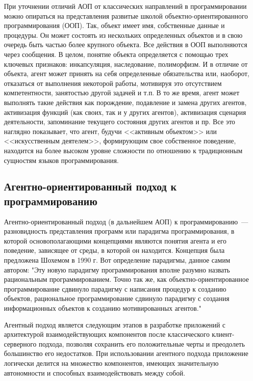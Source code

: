При уточнении отличий АОП от классических направлений в программировании можно опираться на представления развитые школой объектно-ориентированного программирования (ООП). Так, объект имеет имя, собственные данные и процедуры. Он может состоять из нескольких определенных объектов и в свою очередь быть частью более крупного объекта. Все действия в ООП выполняются через сообщения. В целом, понятие объекта определяется с помощью трех ключевых признаков: инкапсуляция, наследование, полиморфизм. И в отличие от объекта, агент может принять на себя определенные обязательства или, наоборот, отказаться от выполнения некоторой работы, мотивируя это отсутствием компетентности, занятостью другой задачей и т.п. В то же время, агент может выполнять такие действия как порождение, подавление и замена других агентов, активизация функций (как своих, так и у других агентов), активизация сценария деятельности, запоминание текущего состояния других агентов и пр. Все это наглядно показывает, что агент, будучи <<активным объектом>> или <<искусственным деятелем>>, формирующим свое собственное поведение, находится на более высоком уровне сложности по отношению к традиционным сущностям языков программирования.

\subsection{Агентно-ориентированный подход к программированию}
Агентно-ориентированный подход (в дальнейшем АОП) к программированию~---  разновидность представления программ или парадигма программирования, в которой основополагающими концепциями являются понятия агента и его поведение, зависящее от среды, в которой он находится. Концепция была предложена Шохемом в 1990 г. Вот определение парадигмы, данное самим автором:
"Эту новую парадигму программирования вполне разумно назвать рациональным программированием. Точно так же, как объектно-ориентированное программирование сдвинуло парадигму с написания процедур к созданию объектов, рациональное программирование сдвинуло парадигму с создания информационных объектов к созданию мотивированных агентов."

Агентный подход является следующим этапов в разработке приложений с архитектурой взаимодействующих компонентов после классического клиент-серверного подхода, позволяя сохранить его положительные черты и преодолеть большинство его недостатков. При использовании агентного подхода приложение логически делится на множество компонентов, имеющих значительную автономности и способных взаимодействовать между собой.

